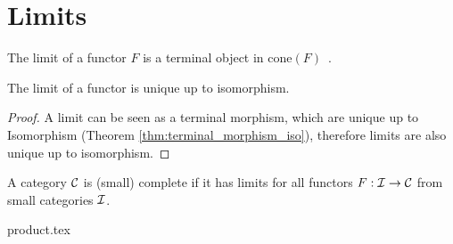 \section{Limits}

\begin{definition}[Limit]

	The limit of a functor $F$ is a terminal object in
	$\mathrm{cone}(F)$~\parencite[p.~118]{leinster:basic_category_theory}.
\end{definition}

\begin{theorem}\label{thm:limit_iso}
	The limit of a functor is unique up to isomorphism.

	\begin{proof}
		A limit can be seen as a terminal morphism, which are unique up to
		Isomorphism (Theorem \ref{thm:terminal_morphism_iso}), therefore limits are
		also unique up to isomorphism.
	\end{proof}
\end{theorem}

\begin{definition}
	A category $\mathcal{C}$ is (small) complete if it has limits for all functors $F:\mathcal{I}
	\to \mathcal{C}$ from small categories $\mathcal{I}$.
\end{definition}

{product.tex}




